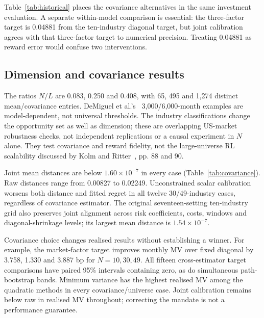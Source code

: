 \documentclass[sigconf,anonymous,review]{acmart}
\begin{document}
Table~\ref{tab:historical} places the covariance alternatives in the same investment evaluation. A separate within-model comparison is essential: the three-factor target is 0.04881 from the ten-industry diagonal target, but joint calibration agrees with that three-factor target to numerical precision. Treating 0.04881 as reward error would confuse two interventions.

\subsection{Dimension and covariance results}
The ratios $N/L$ are 0.083, 0.250 and 0.408, with 65, 495 and 1,274 distinct mean/covariance entries. DeMiguel et al.'s~\cite{demiguel2009} 3,000/6,000-month examples are model-dependent, not universal thresholds. The industry classifications change the opportunity set as well as dimension; these are overlapping US-market robustness checks, not independent replications or a causal experiment in $N$ alone. They test covariance and reward fidelity, not the large-universe RL scalability discussed by Kolm and Ritter~\cite{kolm2025}, pp. 88 and 90.

\begin{table}[t]
\centering
\caption{Within-estimator fidelity and own-state performance across all eighteen covariance/universe cases. Distances use each estimator's own fitted reference. Joint calibration agrees with it; minimum variance generally represents a different preference. Monthly MV scores are in basis-point units.}
\label{tab:covariance}

\end{table}

Joint mean distances are below $1.60\times10^{-7}$ in every case (Table~\ref{tab:covariance}). Raw distances range from 0.00827 to 0.02249. Unconstrained scalar calibration worsens both distance and fitted regret in all twelve 30/49-industry cases, regardless of covariance estimator. The original seventeen-setting ten-industry grid also preserves joint alignment across risk coefficients, costs, windows and diagonal-shrinkage levels; its largest mean distance is $1.54\times10^{-7}$.

Covariance choice changes realised results without establishing a winner. For example, the market-factor target improves monthly MV over fixed diagonal by 3.758, 1.330 and 3.887 bp for $N=10,30,49$. All fifteen cross-estimator target comparisons have paired 95\% intervals containing zero, as do simultaneous path-bootstrap bands. Minimum variance has the highest realised MV among the quadratic methods in every covariance/universe case. Joint calibration remains below raw in realised MV throughout; correcting the mandate is not a performance guarantee.
\end{document}
